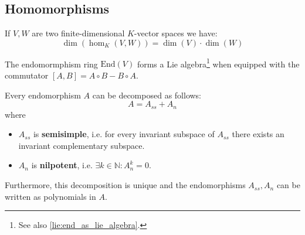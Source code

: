 \subsection{Homomorphisms}

	\begin{formula}\label{linalgebra:hom_dimension}
	    	If $V,W$ are two finite-dimensional $K$-vector spaces we have:
        	\begin{equation}
        		\dim\left(\hom_K(V,W)\right) =\dim(V)\cdot\dim(W)
		\end{equation}
	\end{formula}
        
	\begin{property}
		The endomormphism ring $\text{End}(V)$ forms a Lie algebra\footnote{See also \ref{lie:end_as_lie_algebra}.} when equipped with the commutator $[A, B] = A\circ B - B\circ A$.
	\end{property}
	
	\begin{property}\label{linalgebra:jordan_chevalley}
		Every endomorphism $A$ can be decomposed as follows:
		\begin{equation}
			A = A_{ss} + A_n
		\end{equation}
		where
		\begin{itemize}
			\item $A_{ss}$ is \textbf{semisimple}, i.e. for every invariant subspace of $A_{ss}$ there exists an invariant complementary subspace.
			\item $A_n$ is \textbf{nilpotent}, i.e. $\exists k\in\mathbb{N}: A_n^k = 0$.
		\end{itemize}
		Furthermore, this decomposition is unique and the endomorphisms $A_{ss}, A_n$ can be written as polynomials in $A$.
	\end{property}
    
